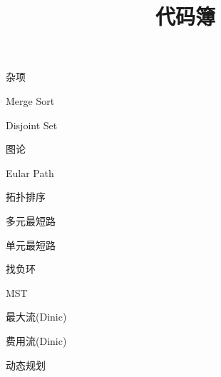 \documentclass{article}
\title{代码簿}
\begin{document}
\maketitle

\begin{enumerate}

{\bf \LARGE \item  杂项}

	\begin{itemize}

	{\bf \item  Merge Sort}
	

	{\bf \item  Disjoint Set}
	

	\end{itemize}

{\bf \LARGE \item  图论}


	\begin{itemize}
	
	{\bf \item  Eular Path}	
	
	
	{\bf \item  拓扑排序}	
		
	
	{\bf \item  多元最短路}
		
	
	{\bf \item  单元最短路}
	
	
	{\bf \item  找负环}
	
	
	{\bf \item MST}
	
	
	{\bf \item 最大流(Dinic)}
	
	
	{\bf \item 费用流(Dinic)}
	
	
	\end{itemize}

{\bf \LARGE \item  动态规划}


\end{enumerate}
\end{document}

